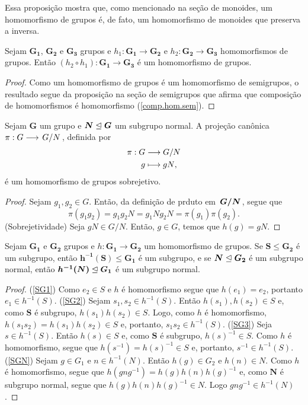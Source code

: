 	Essa proposição mostra que, como mencionado na seção de monoides, um homomorfismo de grupos é, de fato, um homomorfismo de monoides que preserva a inversa.

\begin{prop}
\label{comp.hom.gru}
Sejam $\bm{G_1}$, $\bm{G_2}$ e $\bm{G_3}$ grupos e $h_1: \bm{G_1} \to \bm{G_2}$ e $h_2: \bm{G_2} \to \bm{G_3}$ homomorfismos de grupos. Então $(h_2 \circ h_1): \bm{G_1} \to \bm{G_3}$ é um homomorfismo de grupos.
\end{prop}
\begin{proof}
Como um homomorfismo de grupos é um homomorfismo de semigrupos, o resultado segue da proposição na seção de semigrupos que afirma que composição de homomorfismos é homomorfismo (\ref{comp.hom.sem}).
\end{proof}

\begin{prop}
Sejam $\bm G$ um grupo e $\bm N \mathrel{\unlhd} \bm G$ um subgrupo normal. A projeção canônica $\pi: G \to \quo{G}{N}$, definida por
	\begin{align*}
	{\pi}: {G} &\longrightarrow {G/N} \\{g} &\longmapsto {gN},
	\end{align*}
é um homomorfismo de grupos sobrejetivo.
\end{prop}
\begin{proof}
Sejam $g_1,g_2 \in G$. Então, da definição de prduto em $\bm{\quo{G}{N}}$, segue que
	\begin{equation*}
	\pi(g_1g_2) = g_1g_2N = g_1Ng_2N = \pi(g_1)\pi(g_2).
	\end{equation*}
(Sobrejetividade) Seja $gN \in G/N$. Então, $g \in G$, temos que $h(g)=gN$.
\end{proof}

\begin{prop}
\label{alge:prop.gru.hominv}
Sejam $\bm{G_1}$ e $\bm{G_2}$ grupos e $h: \bm{G_1} \to \bm{G_2}$ um homomorfismo de grupos. Se $\bm S \leq \bm{G_2}$ é um subgrupo, então $\bm{h^{-1}(S)} \leq \bm{G_1}$ é um subgrupo, e se $\bm N \mathrel{\unlhd} \bm{G_2}$ é um subgrupo normal, então $\bm{h^{-1}(N)} \mathrel{\unlhd} \bm{G_1}$ é um subgrupo normal.
\end{prop}
\begin{proof}
(\ref{SG1}) Como $e_2 \in S$ e $h$ é homomorfismo segue que $h(e_1)=e_2$, portanto $e_1 \in h^{-1}(S)$.
(\ref{SG2}) Sejam $s_1,s_2 \in h^{-1}(S)$. Então $h(s_1),h(s_2) \in S$ e, como $\bm S$ é subgrupo, $h(s_1)h(s_2) \in S$. Logo, como $h$ é homomorfismo, $h(s_1s_2) = h(s_1)h(s_2) \in S$ e, portanto, $s_1s_2 \in h^{-1}(S)$.
(\ref{SG3}) Seja $s \in h^{-1}(S)$. Então $h(s) \in S$ e, como $\bm S$ é subgrupo, $h(s)^{-1} \in S$. Como $h$ é homomorfismo, segue que $h(s^{-1})=h(s)^{-1} \in S$ e, portanto, $s^{-1} \in h^{-1}(S)$.  
(\ref{SGN}) Sejam $g \in G_1$ e $n \in h^{-1}(N)$. Então $h(g) \in G_2$ e $h(n) \in N$. Como $h$ é homomorfismo, segue que $h(gng^{-1})=h(g)h(n)h(g)^{-1}$ e, como $\bm N$ é subgrupo normal, segue que $h(g)h(n)h(g)^{-1} \in N$. Logo $gng^{-1} \in h^{-1}(N)$.
\end{proof}

